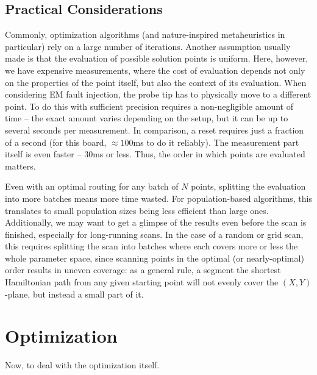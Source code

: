 \documentclass[times, utf8, diplomski]{fer}
\begin{document}
\section{Practical Considerations}\label{sec:practical_considerations}
Commonly, optimization algorithms (and nature-inspired metaheuristics in
particular) rely on a large number of iterations. Another assumption usually
made is that the evaluation of possible solution points is uniform. Here,
however, we have expensive measurements, where the cost of evaluation depends
not only on the properties of the point itself, but also the context of its
evaluation.
%
When considering EM fault injection, the probe tip has to physically move to
a different point. To do this with sufficient precision requires a non-negligible
amount of time -- the exact amount varies depending on the setup, but it can be
up to several seconds per measurement. In comparison, a reset requires just a
fraction of a second (for this board, $\approx100$ms to do it reliably). The
measurement part itself is even faster -- 30ms or less. Thus, the order in which
points are evaluated matters.

Even with an optimal routing for any batch of $N$ points, splitting the
evaluation into more batches means more time wasted. For population-based
algorithms, this translates to small population sizes being less efficient
than large ones. Additionally, we may want to get a glimpse of the results
even before the scan is finished, especially for long-running scans. In the
case of a random or grid scan, this requires splitting the scan into batches
where each covers more or less the whole parameter space, since scanning points
in the optimal (or nearly-optimal) order results in uneven coverage: as a
general rule, a segment the shortest Hamiltonian path from any given starting
point will not evenly cover the $(X,Y)$-plane, but instead a small part of it.




\chapter{Optimization}\label{ch:optimization}
Now, to deal with the optimization itself.
\end{document}
